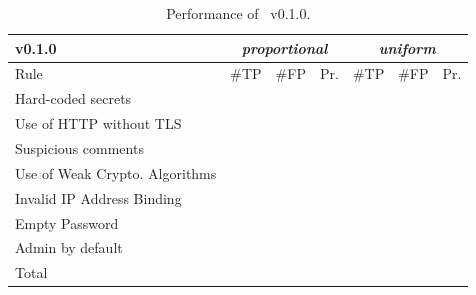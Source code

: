 \begin{table}[t!]
  \small
  \centering
  \setlength{\tabcolsep}{4pt}
  \caption{Performance of \toolname\ v0.1.0.}
  \label{tab:prel_analysis_infrasecure}
  \vspace{-2ex}  
  \begin{tabular}{lrrrrrr} 
    \toprule
    \cellcolor{Gray} \textbf{\toolname{} v0.1.0} & \multicolumn{3}{c}{\textit{proportional}} & \multicolumn{3}{c}{\textit{uniform}}\\\midrule
    Rule & \#TP & \#FP & Pr. &  \#TP & \#FP & Pr. \\
    \midrule
    Hard-coded secrets & \tpHardcodedSecretsInfraSecureProportional{} & \fpHardcodedSecretsInfraSecureProportional{} & \precHardcodedSecretsInfraSecureProportional{} & 
    \tpHardcodedSecretsInfraSecureUniform{} & \fpHardcodedSecretsInfraSecureUniform{} & \precHardcodedSecretsInfraSecureUniform{} \\
    Use of HTTP without TLS & \tpHttpWithoutTLSInfraSecureProportional{} & \fpHttpWithoutTLSInfraSecureProportional{} & \precHttpWithoutTLSInfraSecureProportional{} & 
    \tpHttpWithoutTLSInfraSecureUniform{} & \fpHttpWithoutTLSInfraSecureUniform{} & \precHttpWithoutTLSInfraSecureUniform{} \\
    Suspicious comments & \tpSuspiciousCommentsInfraSecureProportional{} & \fpSuspiciousCommentsInfraSecureProportional{} & \precSuspiciousCommentsInfraSecureProportional{} & 
    \tpSuspiciousCommentsInfraSecureUniform{} & \fpSuspiciousCommentsInfraSecureUniform{} & \precSuspiciousCommentsInfraSecureUniform{} \\
    Use of Weak Crypto. Algorithms & \tpWeakCryptoInfraSecureProportional{} & \fpWeakCryptoInfraSecureProportional{} & \precWeakCryptoInfraSecureProportional{} & 
    \tpWeakCryptoInfraSecureUniform{} & \fpWeakCryptoInfraSecureUniform{} & \precWeakCryptoInfraSecureUniform{} \\
    Invalid IP Address Binding & \tpInvalidIPInfraSecureProportional{} & \fpInvalidIPInfraSecureProportional{} & \precInvalidIPInfraSecureProportional{} &
    \tpInvalidIPInfraSecureUniform{} & \fpInvalidIPInfraSecureUniform{} & \precInvalidIPInfraSecureUniform{} \\
    Empty Password & \tpEmptyPassInfraSecureProportional{} & \fpEmptyPassInfraSecureProportional{} & \precEmptyPassInfraSecureProportional{} & 
    \tpEmptyPassInfraSecureUniform{} & \fpEmptyPassInfraSecureUniform{} & \precEmptyPassInfraSecureUniform{} \\
    Admin by default & \tpAdminDefaultInfraSecureProportional{} & \fpAdminDefaultInfraSecureProportional{} & \precAdminDefaultInfraSecureProportional{} & 
    \tpAdminDefaultInfraSecureUniform{} & \fpAdminDefaultInfraSecureUniform{} & \precAdminDefaultInfraSecureUniform{}\\
    \midrule
    Total & \tpInfraSecureProportionalSample{} & \fpInfraSecureProportionalSample{} & \precTotalInfraSecureProportional{} & \tpInfraSecureUniformSample{} & \fpInfraSecureUniformSample{} & \precTotalInfraSecureUniform{} \\
    \bottomrule 
  \end{tabular}
  \vspace{-3ex}  
\end{table}


